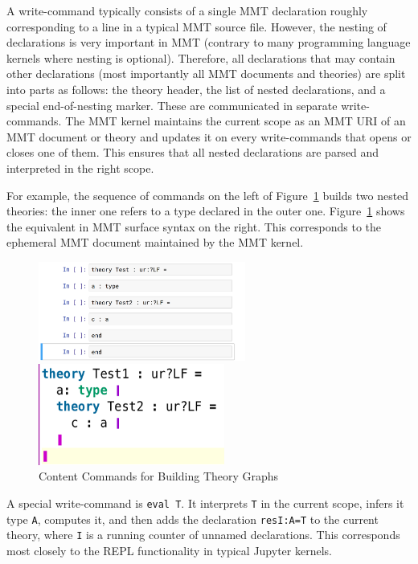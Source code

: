 A write-command typically consists of a single MMT declaration roughly corresponding to a line in a typical MMT source file.
However, the nesting of declarations is very important in MMT (contrary to many programming language kernels where nesting is optional).
Therefore, all declarations that may contain other declarations (most importantly all MMT documents and theories) are split into parts as follows: the theory header, the list of nested declarations, and a special end-of-nesting marker. These are communicated in separate write-commands.
The MMT kernel maintains the current scope as an MMT URI of an MMT document or theory and updates it on every write-commands that opens or closes one of them.
This ensures that all nested declarations are parsed and interpreted in the right scope.

For example, the sequence of commands on the left of Figure~\ref{fig:test_theory} builds two nested theories: the inner one refers to a type declared in the outer one. Figure~\ref{fig:test_theory} shows the equivalent in MMT surface syntax on the right. This corresponds to the ephemeral MMT document maintained by the MMT kernel.
\begin{figure}[ht]\centering
\begin{minipage}[c]{6.8cm}\includegraphics[width=6.8cm]{test_theory_jupyter}\end{minipage}
\begin{minipage}[c]{6.1cm}\includegraphics[width=6.1cm]{test_theory}\end{minipage}
\caption{Content Commands for Building Theory Graphs}\label{fig:test_theory}
\end{figure}

A special write-command is \texttt{eval T}.
It interprets \texttt{T} in the current scope, infers it type \texttt{A}, computes it, and then adds the declaration \texttt{resI:A=T} to the current theory, where \texttt{I} is a running counter of unnamed declarations.
This corresponds most closely to the REPL functionality in typical Jupyter kernels.

